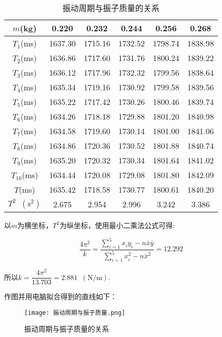 \documentclass[11pt]{article}
\newcommand*{\unit}[1]{\mathop{}\!\mathrm{#1}}
\begin{document}
\begin{table}[H]
    \centering
    \caption{振动周期与振子质量的关系}
    \begin{tabular}{|c|c|c|c|c|c|}
        \hline
        $m$(kg)&0.220  & 0.232  & 0.244  & 0.256  & 0.268  \\
        \hline
        $T_1$(ms)&1637.30  & 1715.16  & 1732.52  & 1798.74  & 1838.98 \\
        \hline
        $T_2$(ms)&1636.86  & 1717.60  & 1731.76  & 1800.24  & 1839.22  \\
        \hline
        $T_3$(ms)&1636.12  & 1717.96  & 1732.32  & 1799.56  & 1838.64  \\
        \hline
        $T_4$(ms)&1635.34  & 1719.16  & 1730.92  & 1799.58  & 1839.56  \\
        \hline
        $T_5$(ms)&1635.22  & 1717.42  & 1730.26  & 1800.46  & 1839.74  \\
        \hline
        $T_6$(ms)&1634.26  & 1718.18  & 1729.88  & 1801.20  & 1840.98  \\
        \hline
        $T_7$(ms)&1634.58  & 1719.60  & 1730.14  & 1801.00  & 1841.06  \\
        \hline
        $T_8$(ms)&1634.86  & 1720.36  & 1730.52  & 1801.88  & 1840.74  \\
        \hline
        $T_9$(ms)&1635.20  & 1720.32  & 1730.34  & 1801.64  & 1841.02  \\
        \hline
        $T_10$(ms)&1634.44  & 1720.08  & 1729.08  & 1801.80  & 1842.09  \\
        \hline
        $T$(ms)&1635.42  & 1718.58  & 1730.77  & 1800.61  & 1840.20  \\
        \hline
        $T^2 \unit{(s^2)}$&2.675  & 2.954  & 2.996  & 3.242  & 3.386   \\
        \hline
    \end{tabular}
\end{table}

以$m$为横坐标，$T^2$为纵坐标，使用最小二乘法公式可得:

\[
    \frac{4\pi^2}{k} = \frac{\sum_{i=1}^{5}x_i y_i - n\bar{x}\bar{y}}{\sum_{i=1}^{5} x_i^2 - n\bar{x}^2} = 12.292
\]

所以$k=\dfrac{4\pi^2}{13.703} = 2.881 \unit{(N/m)}$.

作图并用电脑拟合得到的直线如下：

\begin{figure}[H]
    \centering
    \texttt{[image: 振动周期与振子质量.png]}
    \caption{振动周期与振子质量的关系}
\end{figure}
\end{document}
